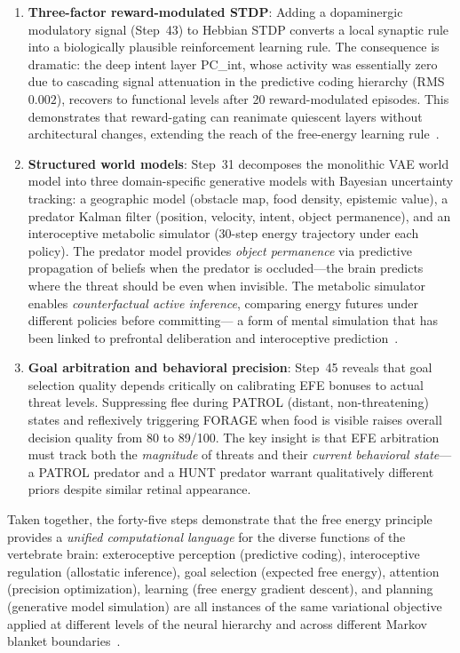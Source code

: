 \documentclass[11pt,a4paper]{article}
\begin{document}
\begin{enumerate}[nosep]
    Brain-derived tonic drive modulates frequency; the CPG glide phase is
    bypassed during FLEE for uninterrupted escape thrust.
  \item \textbf{Three-factor reward-modulated STDP}: Adding a dopaminergic
    modulatory signal (Step~43) to Hebbian STDP converts a local synaptic
    rule into a biologically plausible reinforcement learning rule.
    The consequence is dramatic: the deep intent layer PC\_int, whose activity
    was essentially zero due to cascading signal attenuation in the
    predictive coding hierarchy (RMS $0.002$), recovers to functional levels
    after 20 reward-modulated episodes.
    This demonstrates that reward-gating can reanimate quiescent layers
    without architectural changes, extending the reach of the free-energy
    learning rule~\cite{fremaux2016}.
  \item \textbf{Structured world models}: Step~31 decomposes the monolithic
    VAE world model into three domain-specific generative models with
    Bayesian uncertainty tracking: a geographic model (obstacle map,
    food density, epistemic value), a predator Kalman filter (position,
    velocity, intent, object permanence), and an interoceptive metabolic
    simulator (30-step energy trajectory under each policy).
    The predator model provides \emph{object permanence} via predictive
    propagation of beliefs when the predator is occluded---the brain
    predicts where the threat should be even when invisible.
    The metabolic simulator enables \emph{counterfactual active inference},
    comparing energy futures under different policies before committing---
    a form of mental simulation that has been linked to prefrontal
    deliberation and interoceptive prediction~\cite{pezzulo2015,craig2009}.
  \item \textbf{Goal arbitration and behavioral precision}: Step~45 reveals
    that goal selection quality depends critically on calibrating
    EFE bonuses to actual threat levels.
    Suppressing flee during PATROL (distant, non-threatening) states
    and reflexively triggering FORAGE when food is visible
    raises overall decision quality from 80 to 89/100.
    The key insight is that EFE arbitration must track both the
    \emph{magnitude} of threats and their \emph{current behavioral state}---
    a PATROL predator and a HUNT predator warrant qualitatively different
    priors despite similar retinal appearance.
\end{enumerate}

Taken together, the forty-five steps demonstrate that the free energy
principle provides a \emph{unified computational language} for the
diverse functions of the vertebrate brain: exteroceptive perception
(predictive coding), interoceptive regulation (allostatic inference),
goal selection (expected free energy), attention (precision optimization),
learning (free energy gradient descent), and planning (generative model
simulation) are all instances of the same variational objective
applied at different levels of the neural hierarchy and across different
Markov blanket boundaries~\cite{friston2010,parr2022}.
\end{document}
